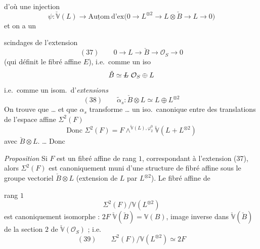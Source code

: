 \documentclass[11pt,a4paper]{article}
\begin{document}
   

d'où une injection
\[
\psi : \check{\mathbb{V}}(L) \longrightarrow \underline{\mathrm{Autom}}\ \text{d'ex}\bigl(0 \to L^{\otimes 2} \to L \otimes \check{B} \to L \to 0\bigr)
\]
et on a un \ill{}

 scindages de \struck{\ill{}} l'extension
\[
(37)\qquad 0 \to L \to \check{B} \to \mathcal{O}_S \to 0
\]
(qui définit le fibré affine $E$), i.e.\ comme un iso
\[
\check{B} \simeq \text{\struck{$L$}}\ \mathcal{O}_S \oplus L
\]
i.e.\ comme un isom.\ d'\emph{extensions}
\[
(38)\qquad \tilde{\alpha}_s : \check{B} \otimes L \simeq L \oplus L^{\otimes 2}
\]
On trouve que … et que $\alpha_s$ transforme … un iso.\ canonique entre  des translations de l'espace affine $\Sigma^2(F)$ \struck{\ill{}}
\[
\text{Donc } \Sigma^2(F) = F \wedge^{\check{\mathbb{V}}(L), \varphi_2^0} \check{\mathbb{V}}(L + L^{\otimes 2})
\]
avec $\check{B} \otimes L$. … Donc

\emph{Proposition} \struck{\ill{}} Si $F$ est un fibré affine de rang $1$,  correspondant à l'extension (37), alors $\Sigma^2(F)$ est canoniquement muni d'une structure de fibré affine sous le groupe vectoriel $\check{B} \otimes L$ (extension de $L$ par $L^{\otimes 2}$). Le fibré  affine de

rang $1$
\[
\Sigma^2(F)/\mathbb{V}(L^{\otimes 2})
\]
est canoniquement isomorphe : $2F$  $\check{\mathbb{V}}(\check{B}) = \mathbb{V}(B)$, image inverse dans $\check{\mathbb{V}}(\check{B})$ de la section $2$ de $\check{\mathbb{V}}(\mathcal{O}_S)$ ; i.e.
\[
(39)\qquad \Sigma^2(F)/\mathbb{V}(L^{\otimes 2}) \simeq 2F
\]
\end{document}
